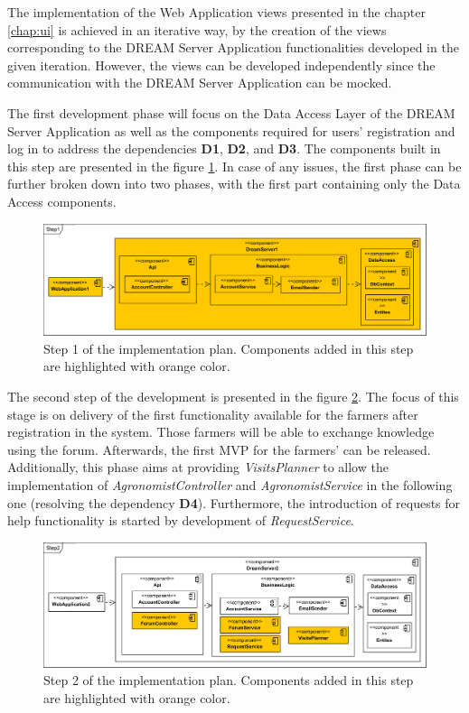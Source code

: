 The implementation of the Web Application views presented in the chapter \ref{chap:ui} is achieved in an iterative way, by the creation of the views corresponding to the DREAM Server Application functionalities developed in the given iteration. However, the views can be developed independently since the communication with the DREAM Server Application can be mocked. 

The first development phase will focus on the Data Access Layer of the DREAM Server Application as well as the components required for users' registration and log in to address the dependencies \textbf{D1}, \textbf{D2}, and \textbf{D3}. The components built in this step are presented in the figure \ref{fig:step1}. In case of any issues, the first phase can be further broken down into two phases, with the first part containing only the Data Access components.

\begin{figure}[H]
    \centering
    \includegraphics[width=\textwidth]
    {diagrams/implementation-plan/Step1.png}
    \caption{Step 1 of the implementation plan. Components added in this step are highlighted with orange color.}
    \label{fig:step1}
\end{figure}

The second step of the development is presented in the figure \ref{fig:step2}. The focus of this stage is on delivery of the first functionality available for the farmers after registration in the system. Those farmers will be able to exchange knowledge using the forum.  Afterwards, the first MVP for the farmers' can be released. Additionally, this phase aims at providing \textit{VisitsPlanner} to allow the implementation of \textit{AgronomistController} and \textit{AgronomistService} in the following one (resolving the dependency \textbf{D4}). Furthermore, the introduction of requests for help functionality is started by development of \textit{RequestService}.

\begin{figure}[H]
    \centering
    \includegraphics[width=\textwidth]
    {diagrams/implementation-plan/Step2.png}
    \caption{Step 2 of the implementation plan. Components added in this step are highlighted with orange color.}
    \label{fig:step2}
\end{figure}

